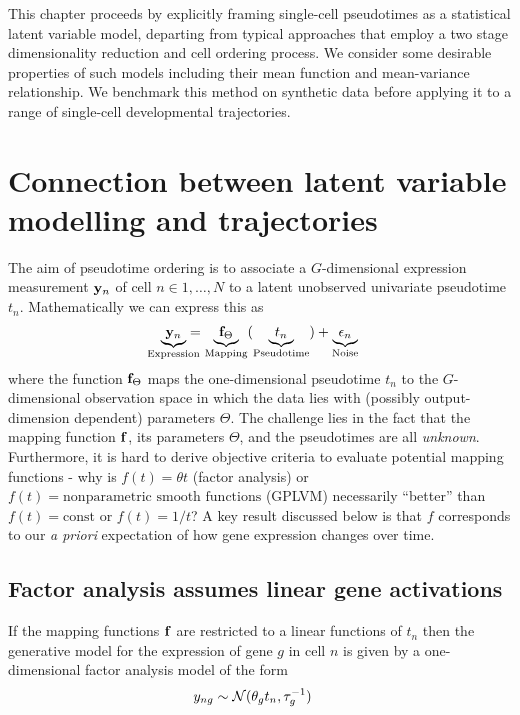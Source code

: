 This chapter proceeds by explicitly framing single-cell pseudotimes as a statistical latent variable model, departing from typical approaches that employ a two stage dimensionality reduction and cell ordering process. We consider some desirable properties of such models including their mean function and mean-variance relationship. We benchmark this method on synthetic data before applying it to a range of single-cell developmental trajectories.


\section{Connection between latent variable modelling and trajectories} \label{sec:latvar}

The aim of pseudotime ordering is to associate a $G$-dimensional expression measurement $\mathbf{y}_n$ of cell $n \in 1, \ldots, N$ to a latent unobserved univariate pseudotime $t_n$. Mathematically we can express this as
\begin{equation} 
 \underbrace{\mby_n}_{\mathclap{\text{Expression}}} = \underbrace{\mbf_\Theta}_{\text{Mapping}}(\underbrace{t_n}_{\text{Pseudotime}}) + \underbrace{\epsilon_n}_{\text{Noise}}
 \label{eq:master_eq}
\end{equation}
where the function $\mathbf{f}_\Theta$ maps the one-dimensional pseudotime $t_n$ to the $G$-dimensional observation space in which the data lies with (possibly output-dimension dependent) parameters $\Theta$. The challenge lies in the fact that the mapping function $\mathbf{f}$, its parameters $\Theta$, and the pseudotimes are all \emph{unknown}. Furthermore, it is hard to derive objective criteria to evaluate potential mapping functions - why is $f(t) = \theta t$ (factor analysis) or $f(t) = \text{nonparametric smooth functions}$ (GPLVM) necessarily ``better'' than $f(t) = \text{const}$ or $f(t) = 1 / t$? A key result discussed below is that $f$ corresponds to our \emph{a priori} expectation of how gene expression changes over time.


\subsection{Factor analysis assumes linear gene activations}

If the mapping functions $\mathbf{f}$ are restricted to a linear functions of $t_n$ then the generative model for the expression of gene $g$ in cell $n$ is given by a one-dimensional factor analysis model of the form
\begin{equation} \label{eq:fa}
	\begin{aligned}
		y_{ng} & \sim \mathcal{N}(\theta_g t_n, \tau^{-1}_g)
	\end{aligned}
\end{equation}

